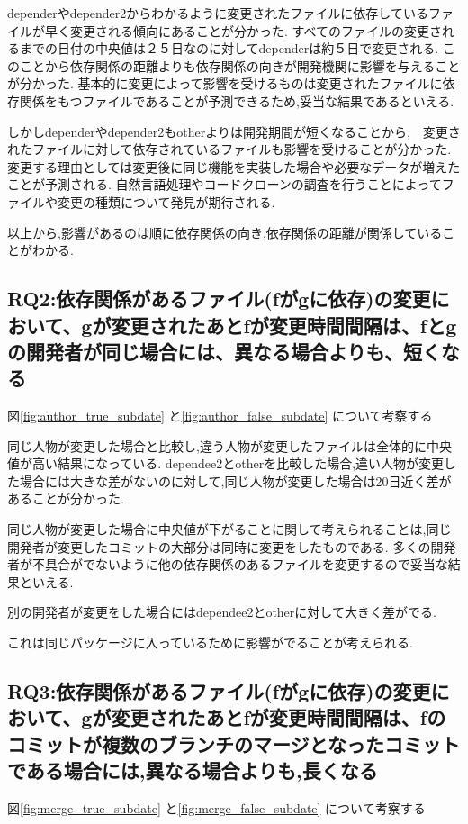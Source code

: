 \documentclass{fose2016}           %
\begin{document}
dependerやdepender2からわかるように変更されたファイルに依存しているファイルが早く変更される傾向にあることが分かった.
すべてのファイルの変更されるまでの日付の中央値は２５日なのに対してdependerは約５日で変更される.
このことから依存関係の距離よりも依存関係の向きが開発機関に影響を与えることが分かった.
基本的に変更によって影響を受けるものは変更されたファイルに依存関係をもつファイルであることが予測できるため,妥当な結果であるといえる.

しかしdependerやdepender2もotherよりは開発期間が短くなることから,　変更されたファイルに対して依存されているファイルも影響を受けることが分かった.
変更する理由としては変更後に同じ機能を実装した場合や必要なデータが増えたことが予測される.
自然言語処理やコードクローンの調査を行うことによってファイルや変更の種類について発見が期待される.


以上から,影響があるのは順に依存関係の向き,依存関係の距離が関係していることがわかる.


\subsection{RQ2:依存関係があるファイル(fがgに依存)の変更において、gが変更されたあとfが変更時間間隔は、fとgの開発者が同じ場合には、異なる場合よりも、短くなる}
図\ref{fig:author_true_subdate} と\ref{fig:author_false_subdate} について考察する

同じ人物が変更した場合と比較し,違う人物が変更したファイルは全体的に中央値が高い結果になっている.
dependee2とotherを比較した場合,違い人物が変更した場合には大きな差がないのに対して,同じ人物が変更した場合は20日近く差があることが分かった.

同じ人物が変更した場合に中央値が下がることに関して考えられることは,同じ開発者が変更したコミットの大部分は同時に変更をしたものである.
多くの開発者が不具合がでないように他の依存関係のあるファイルを変更するので妥当な結果といえる.

別の開発者が変更をした場合にはdependee2とotherに対して大きく差がでる.

これは同じパッケージに入っているために影響がでることが考えられる.

\subsection{RQ3:依存関係があるファイル(fがgに依存)の変更において、gが変更されたあとfが変更時間間隔は、fのコミットが複数のブランチのマージとなったコミットである場合には,異なる場合よりも,長くなる}
図\ref{fig:merge_true_subdate} と\ref{fig:merge_false_subdate} について考察する
\end{document}
